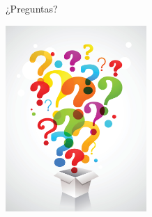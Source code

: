 \documentclass[aspectratio=169]{beamer}
\begin{document}
\begin{frame}{¿Preguntas?}
	\begin{center}
		\includegraphics[width=0.4\textwidth]{imgs/cmn/preguntas.pdf}
	\end{center}
\end{frame}
\end{document}

